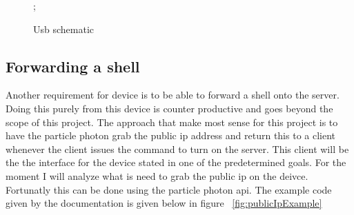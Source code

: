 \documentclass{article}
\begin{document}
\begin{figure}[H]
    \noindent{};
    \caption{Usb schematic} \label{fig:usbSch}
\end{figure}

\subsection{Forwarding a shell}
Another requirement for device is to be able to forward a shell onto the server. Doing this
purely from this device is counter productive and goes beyond the scope of this project. The
approach that make most sense for this project is to have the particle photon grab the public
ip address and return this to a client whenever the client issues the command to turn on the
server. This client will be the the interface for the device stated in one of the predetermined
goals. For the moment I will analyze what is need to grab the public ip on the deivce. Fortunatly
this can be done using the particle photon api\cite{publicIPDocs}. The example code given by the
documentation is given below in figure
~\ref{fig:publicIpExample}
\end{document}
